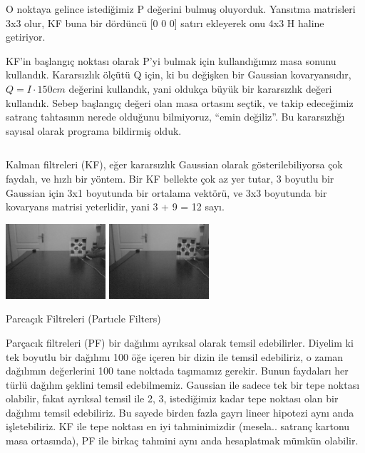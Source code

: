 \documentclass[12pt,fleqn]{article}\usepackage{../../common}
\begin{document}
\inputminted[fontsize=\footnotesize]{python}{util.py}

O noktaya gelince istediğimiz P değerini bulmuş oluyorduk. Yansıtma
matrisleri 3x3 olur, KF buna bir dördüncü [0 0 0] satırı ekleyerek onu 4x3
H haline getiriyor.

KF'in başlangıç noktası olarak P'yi bulmak için kullandığımız masa sonunu
kullandık. Kararsızlık ölçütü Q için, ki bu değişken bir Gaussian
kovaryansıdır, $Q = I \cdot 150 cm$ değerini kullandık, yani oldukça büyük bir
kararsızlık değeri kullandık. Sebep başlangıç değeri olan masa ortasını
seçtik, ve takip edeceğimiz satranç tahtasının nerede olduğunu bilmiyoruz,
``emin değiliz''.  Bu kararsızlığı sayısal olarak programa bildirmiş olduk.

\inputminted[fontsize=\footnotesize]{python}{track-chess-kf.py}

Kalman filtreleri (KF), eğer kararsızlık Gaussian olarak gösterilebiliyorsa çok
faydalı, ve hızlı bir yöntem. Bir KF bellekte çok az yer tutar, 3 boyutlu bir
Gaussian için 3x1 boyutunda bir ortalama vektörü, ve 3x3 boyutunda bir kovaryans
matrisi yeterlidir, yani 3 + 9 = 12 sayı.

\includegraphics[width=10em]{kf-out-50.jpg}
\includegraphics[width=10em]{kf-out-70.jpg}

Parcaçık Filtreleri (Partıcle Filters)

Parçacık filtreleri (PF) bir dağılımı ayrıksal olarak temsil
edebilirler. Diyelim ki tek boyutlu bir dağılımı 100 öğe içeren bir dizin ile
temsil edebiliriz, o zaman dağılımın değerlerini 100 tane noktada taşımamız
gerekir.  Bunun faydaları her türlü dağılım şeklini temsil edebilmemiz. Gaussian
ile sadece tek bir tepe noktası olabilir, fakat ayrıksal temsil ile 2, 3,
istediğimiz kadar tepe noktası olan bir dağılımı temsil edebiliriz. Bu sayede
birden fazla gayrı lineer hipotezi aynı anda işletebiliriz. KF ile tepe noktası
en iyi tahminimizdir (mesela.. satranç kartonu masa ortasında), PF ile birkaç
tahmini aynı anda hesaplatmak mümkün olabilir.
\end{document}
